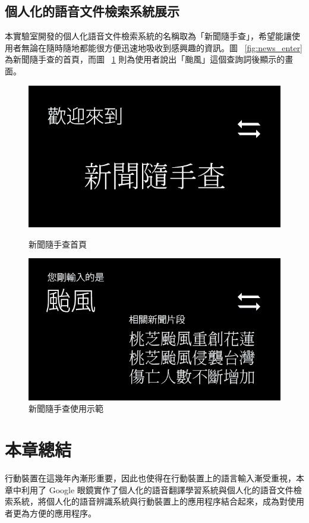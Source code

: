 \subsection{個人化的語音文件檢索系統展示}
本實驗室開發的個人化語音文件檢索系統的名稱取為「新聞隨手查」，希望能讓使用者無論在隨時隨地都能很方便迅速地吸收到感興趣的資訊。圖 ~\ref{fig:news_enter} 為新聞隨手查的首頁，而圖 ~\ref{fig:news_example} 則為使用者說出「颱風」這個查詢詞後顯示的畫面。
\begin{figure}
\centering
\includegraphics[scale=0.3]{images/glass/news_enter.png}
\caption{新聞隨手查首頁} \label{fig:news_enter}
\centering
\includegraphics[scale=0.3]{images/glass/news_example.png}
\caption{新聞隨手查使用示範} \label{fig:news_example}
\end{figure}

\section{本章總結}
行動裝置在這幾年內漸形重要，因此也使得在行動裝置上的語言輸入漸受重視，本章中利用了 Google 眼鏡實作了個人化的語音翻譯學習系統與個人化的語音文件檢索系統，將個人化的語音辨識系統與行動裝置上的應用程序結合起來，成為對使用者更為方便的應用程序。
